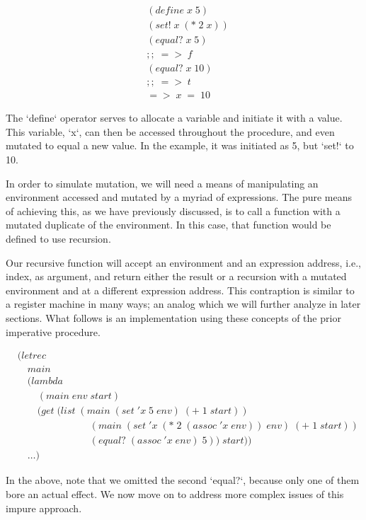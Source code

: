 \begin{align*}
& (define \; x \; 5)
\\& (set! \; x \; (* \; 2 \; x))
\\& (equal? \; x \; 5)
\\& ;; \; => \; f
\\& (equal? \; x \; 10)
\\& ;; \; => \; t
\\& => \; x \; = \; 10
\end{align*}

The `define` operator serves to allocate a variable and initiate it with a value. 
This variable, `x`, can then be accessed throughout the procedure, and even mutated 
to equal a new value. In the example, it was initiated as 5, but `set!` to 10.

In order to simulate mutation, we will need a means of manipulating an environment
accessed and mutated by a myriad of expressions. The pure means of achieving this,
as we have previously discussed, is to call a function with a mutated duplicate of
the environment. In this case, that function would be defined to use recursion.

Our recursive function will accept an environment and an expression address, i.e.,
index, as argument, and return either the result or a recursion with a mutated
environment and at a different expression address. This contraption is similar to 
a register machine in many ways; an analog which we will further analyze in later
sections. What follows is an implementation using these concepts of the prior
imperative procedure.

\begin{align*}
& (letrec \; 
\\& \quad main \; 
\\& \quad (lambda \; 
\\& \qquad (main \; env \; start)
\\& \qquad (get \; (list \; (main \; (set \; 'x \; 5 \; env) \; (+ \; 1 \; start))
\\& \qquad \qquad \qquad \quad \; (main \; (set \; 'x \; (* \; 2 \; (assoc \; 'x \; env)) \; env) \; (+ \; 1 \; start))
\\& \qquad \qquad \qquad \quad \; (equal? \; (assoc \; 'x \; env) \; 5)) \; start))
\\& \quad \dots)
\end{align*}

In the above, note that we omitted the second `equal?`, because only one of them bore
an actual effect. We now move on to address more complex issues of this impure 
approach.

